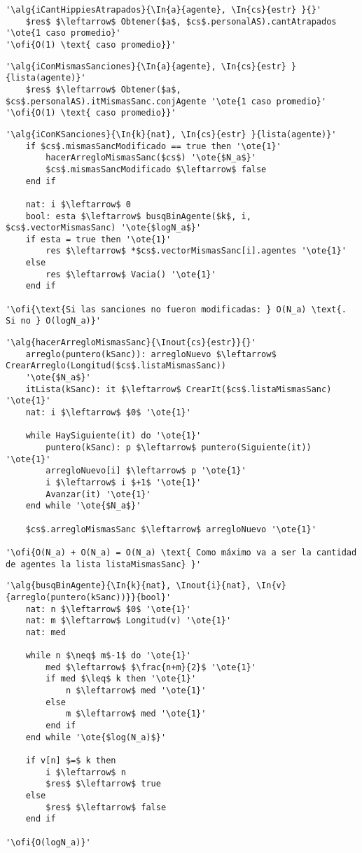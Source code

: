 \begin{lstlisting}[mathescape]
'\alg{iCantHippiesAtrapados}{\In{a}{agente}, \In{cs}{estr} }{}'
	$res$ $\leftarrow$ Obtener($a$, $cs$.personalAS).cantAtrapados '\ote{1 caso promedio}'
'\ofi{O(1) \text{ caso promedio}}'
\end{lstlisting}

\begin{lstlisting}[mathescape]
'\alg{iConMismasSanciones}{\In{a}{agente}, \In{cs}{estr} }{lista(agente)}'
	$res$ $\leftarrow$ Obtener($a$, $cs$.personalAS).itMismasSanc.conjAgente '\ote{1 caso promedio}'
'\ofi{O(1) \text{ caso promedio}}'
\end{lstlisting}

\begin{lstlisting}[mathescape]
'\alg{iConKSanciones}{\In{k}{nat}, \In{cs}{estr} }{lista(agente)}'
	if $cs$.mismasSancModificado == true then '\ote{1}'
		hacerArregloMismasSanc($cs$) '\ote{$N_a$}'
		$cs$.mismasSancModificado $\leftarrow$ false
	end if
	
	nat: i $\leftarrow$ 0
	bool: esta $\leftarrow$ busqBinAgente($k$, i, $cs$.vectorMismasSanc) '\ote{$logN_a$}'
	if esta = true then '\ote{1}'
		res $\leftarrow$ *$cs$.vectorMismasSanc[i].agentes '\ote{1}'
	else
		res $\leftarrow$ Vacia() '\ote{1}'
	end if

'\ofi{\text{Si las sanciones no fueron modificadas: } O(N_a) \text{. Si no } O(logN_a)}'
\end{lstlisting}

\begin{lstlisting}[mathescape]
'\alg{hacerArregloMismasSanc}{\Inout{cs}{estr}}{}'
	arreglo(puntero(kSanc)): arregloNuevo $\leftarrow$ CrearArreglo(Longitud($cs$.listaMismasSanc)) 
	'\ote{$N_a$}'
	itLista(kSanc): it $\leftarrow$ CrearIt($cs$.listaMismasSanc) '\ote{1}'
	nat: i $\leftarrow$ $0$ '\ote{1}'

	while HaySiguiente(it) do '\ote{1}'
		puntero(kSanc): p $\leftarrow$ puntero(Siguiente(it)) '\ote{1}'
		arregloNuevo[i] $\leftarrow$ p '\ote{1}'
		i $\leftarrow$ i $+1$ '\ote{1}'
		Avanzar(it) '\ote{1}'
	end while '\ote{$N_a$}'
	
	$cs$.arregloMismasSanc $\leftarrow$ arregloNuevo '\ote{1}'

'\ofi{O(N_a) + O(N_a) = O(N_a) \text{ Como máximo va a ser la cantidad de agentes la lista listaMismasSanc} }'
\end{lstlisting}

\begin{lstlisting}[mathescape]
'\alg{busqBinAgente}{\In{k}{nat}, \Inout{i}{nat}, \In{v}{arreglo(puntero(kSanc))}}{bool}'
	nat: n $\leftarrow$ $0$ '\ote{1}'
	nat: m $\leftarrow$ Longitud(v) '\ote{1}'
	nat: med
	
	while n $\neq$ m$-1$ do '\ote{1}'
		med $\leftarrow$ $\frac{n+m}{2}$ '\ote{1}'
		if med $\leq$ k then '\ote{1}'
			n $\leftarrow$ med '\ote{1}'
		else
			m $\leftarrow$ med '\ote{1}'
		end if
	end while '\ote{$log(N_a)$}'

	if v[n] $=$ k then
		i $\leftarrow$ n
		$res$ $\leftarrow$ true
	else
		$res$ $\leftarrow$ false
	end if

'\ofi{O(logN_a)}'
\end{lstlisting}

